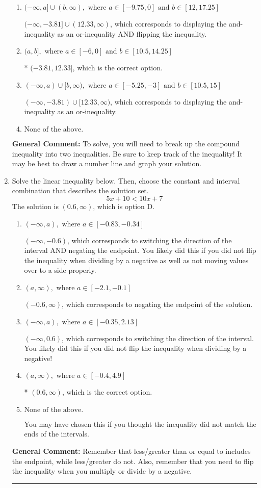 \documentclass{extbook}[14pt]
\newcommand{\litem}[1]{\item #1

\rule{\textwidth}{0.4pt}}
\begin{document}
\begin{enumerate}
{\begin{enumerate}[label=\Alph*.]
$[-3.81, 12.33)$, which corresponds to flipping the inequality.
\item \( (-\infty, a] \cup (b, \infty), \text{ where } a \in [-9.75, 0] \text{ and } b \in [12, 17.25] \)

$(-\infty, -3.81] \cup (12.33, \infty)$, which corresponds to displaying the and-inequality as an or-inequality AND flipping the inequality.
\item \( (a, b], \text{ where } a \in [-6, 0] \text{ and } b \in [10.5, 14.25] \)

* $(-3.81, 12.33]$, which is the correct option.
\item \( (-\infty, a) \cup [b, \infty), \text{ where } a \in [-5.25, -3] \text{ and } b \in [10.5, 15] \)

$(-\infty, -3.81) \cup [12.33, \infty)$, which corresponds to displaying the and-inequality as an or-inequality.
\item \( \text{None of the above.} \)


\end{enumerate}

\textbf{General Comment:} To solve, you will need to break up the compound inequality into two inequalities. Be sure to keep track of the inequality! It may be best to draw a number line and graph your solution.
}
\litem{
Solve the linear inequality below. Then, choose the constant and interval combination that describes the solution set.
\[ 5x + 10 < 10x + 7 \]The solution is \( (0.6, \infty) \), which is option D.\begin{enumerate}[label=\Alph*.]
\item \( (-\infty, a), \text{ where } a \in [-0.83, -0.34] \)

 $(-\infty, -0.6)$, which corresponds to switching the direction of the interval AND negating the endpoint. You likely did this if you did not flip the inequality when dividing by a negative as well as not moving values over to a side properly.
\item \( (a, \infty), \text{ where } a \in [-2.1, -0.1] \)

 $(-0.6, \infty)$, which corresponds to negating the endpoint of the solution.
\item \( (-\infty, a), \text{ where } a \in [-0.35, 2.13] \)

 $(-\infty, 0.6)$, which corresponds to switching the direction of the interval. You likely did this if you did not flip the inequality when dividing by a negative!
\item \( (a, \infty), \text{ where } a \in [-0.4, 4.9] \)

* $(0.6, \infty)$, which is the correct option.
\item \( \text{None of the above}. \)

You may have chosen this if you thought the inequality did not match the ends of the intervals.
\end{enumerate}

\textbf{General Comment:} Remember that less/greater than or equal to includes the endpoint, while less/greater do not. Also, remember that you need to flip the inequality when you multiply or divide by a negative.
}
\end{enumerate}
\end{document}
